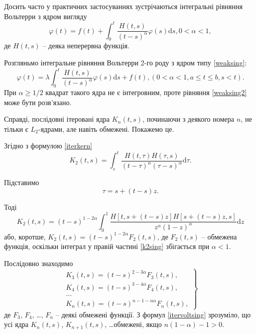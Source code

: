 \documentclass[14pt,twoside]{extreport}
\theoremstyle{mystyle}
\numberwithin{equation}{chapter}
\begin{document}
Досить часто у практичних застосуваннях зустрічаються інтегральні рівняння Вольтерри з ядром вигляду
\begin{equation}\label{weaksing}
	\varphi(t)=f(t)+\displaystyle \int_{0}^{t}\frac{H(t, s)}{(t-s)^{\alpha}}\varphi(s)\mathrm{d}s, 0<\alpha<1,
\end{equation}
де $H(t, s)$ -- деяка неперервна функція.

Розгляньмо інтегральне рівняння Вольтерри 2-го роду з ядром типу \eqref{weaksing}:
\begin{equation}\label{weaksing2}
	\varphi(t)=\displaystyle \lambda\int_{0}^{t}\frac{H(t, s)}{(t-s)^{\alpha}}\varphi(s)\mathrm{d}s + f(t), (0<\alpha<1, a\leqslant t \leqslant b, s<t).
\end{equation}
При $\alpha \geqslant 1/2$ квадрат такого ядра не є інтегровним, проте рівняння \eqref{weaksing2} може бути розв'язано.

Справді, послідовні ітеровані ядра $K_n(t, s)$, починаючи з деякого номера $n$, не тільки є $L_2$-ядрами, але навіть обмежені. Покажемо це.

Згідно з формулою \eqref{iterkern}
\[
 K_2(t, s) = \int_{s}^{t} \frac{H(t, \tau)H(\tau, s)}{(t - \tau)^\alpha(\tau - s)^\alpha}\mathrm{d}\tau.
\]

Підставимо
\[
 \tau = s + (t - s)z.
\]

Тоді
\begin{equation}\label{k2sing}
 K_2(t, s) = (t-s)^{1-2\alpha} \int_0^1 \dfrac{H[t, s + (t-s)z] H[s + (t-s)z, s]}{z^\alpha (1-z)^\alpha} \mathrm{d}z
\end{equation}
або, коротше, $K_2(t, s) = (t - s)^{1-2\alpha}F_2(t, s)$, де $F_2(t, s)$ -- обмежена функція, оскільки інтеграл у правій частині \eqref{k2sing} збігається при $\alpha < 1$.

Послідовно знаходимо
\begin{equation}\label{itervoltsing}
\left.
 \begin{array}{l}
 K_3(t, s) = (t-s)^{2-3\alpha} F_3(t, s),\\
 K_4(t, s) = (t-s)^{3-4\alpha} F_4(t, s),\\
 \ldots\\
 K_n(t, s) = (t-s)^{n-1-n\alpha} F_n(t, s),
 \end{array}
\right\}
\end{equation}
де $F_3$, $F_4$, \ldots, $F_n$ -- деякі обмежені функції. З формул \eqref{itervoltsing} зрозуміло, що усі ядра $K_n(t, s)$, $K_{n+1}(t, s)$, \ldots обмежені, якщо $n(1-\alpha) -1 >0$.
\end{document}
